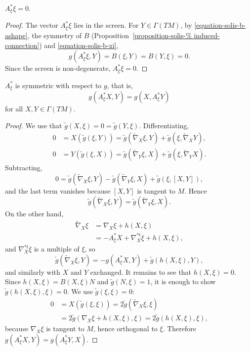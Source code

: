 \begin{exercise}
\label{exercise-solis-a-star-xi}
$A^*_{\xi}\xi=0$.
\end{exercise}

\begin{proof}
The vector $A^*_{\xi}\xi$ lies in the
screen. For $Y\in\Gamma(TM)$, by
\eqref{equation-solis-b-ashape}, the
symmetry of $B$
(Proposition~\ref{proposition-solis-%
induced-connection})
and \eqref{equation-solis-b-xi},
$$
g(A^*_{\xi}\xi,Y)=B(\xi,Y)
=B(Y,\xi)=0.
$$
Since the screen is non-degenerate,
$A^*_{\xi}\xi=0$.
\end{proof}

\begin{exercise}
\label{exercise-solis-a-star-symmetric}
$A^*_{\xi}$ is symmetric with respect to
$g$, that is,
$$
g(A^*_{\xi}X,Y)=g(X,A^*_{\xi}Y)
$$
for all $X,Y\in\Gamma(TM)$.
\end{exercise}

\begin{proof}
We use that
$\widetilde{g}(X,\xi)=0=
\widetilde{g}(Y,\xi)$. Differentiating,
$$
\begin{aligned}
0&=X\left(\widetilde{g}(\xi,Y)\right)
=\widetilde{g}(\widetilde{\nabla}_X\xi,Y)
+\widetilde{g}(\xi,\widetilde{\nabla}_XY),
\\
0&=Y\left(\widetilde{g}(\xi,X)\right)
=\widetilde{g}(\widetilde{\nabla}_Y\xi,X)
+\widetilde{g}(\xi,\widetilde{\nabla}_YX).
\end{aligned}
$$
Subtracting,
$$
0=\widetilde{g}(\widetilde{\nabla}_X\xi,Y)
-\widetilde{g}(\widetilde{\nabla}_Y\xi,X)
+\widetilde{g}(\xi,[X,Y]),
$$
and the last term vanishes because
$[X,Y]$ is tangent to $M$. Hence
$$
\widetilde{g}(\widetilde{\nabla}_X\xi,Y)
=\widetilde{g}(\widetilde{\nabla}_Y\xi,X).
$$
On the other hand,
$$
\begin{aligned}
\widetilde{\nabla}_X\xi
&=\nabla_X\xi+h(X,\xi)\\
&=-A^*_{\xi}X+\nabla^{*t}_X\xi
+h(X,\xi),
\end{aligned}
$$
and $\nabla^{*t}_X\xi$ is a multiple of
$\xi$, so
$$
\widetilde{g}(\widetilde{\nabla}_X\xi,Y)
=-g(A^*_{\xi}X,Y)
+\widetilde{g}(h(X,\xi),Y),
$$
and similarly with $X$ and $Y$
exchanged. It remains to see that
$h(X,\xi)=0$. Since $h(X,\xi)=B(X,\xi)N$
and $\widetilde{g}(N,\xi)=1$, it is enough
to show $\widetilde{g}(h(X,\xi),\xi)=0$.
We use $\widetilde{g}(\xi,\xi)=0$:
$$
\begin{aligned}
0&=X\left(\widetilde{g}(\xi,\xi)\right)
=2\widetilde{g}(\widetilde{\nabla}_X\xi,
\xi)\\
&=2\widetilde{g}(\nabla_X\xi+h(X,\xi),
\xi)
=2\widetilde{g}(h(X,\xi),\xi),
\end{aligned}
$$
because $\nabla_X\xi$ is tangent to $M$,
hence orthogonal to $\xi$. Therefore
$g(A^*_{\xi}X,Y)=g(A^*_{\xi}Y,X)$.
\end{proof}

